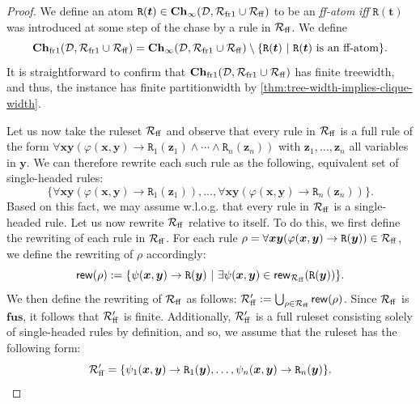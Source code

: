 \documentclass[10pt,a4paper]{amsart}
\theoremstyle{definition}
\numberwithin{equation}{section}
\theoremstyle{plain}
\theoremstyle{definition}
\theoremstyle{myexample}
\theoremstyle{plain}
\theoremstyle{definition}
\renewcommand{\vec}[1]{\boldsymbol{#1}}
\newcommand{\database}{\mathcal{D}}
\newcommand{\db}{\database}
\newcommand{\hypercliquewidth}{\partitionwidth}
\newcommand{\partitionwidth}{par\-ti\-tion\-width}
\newcommand{\fcn}[1]{\mathsf{#1}}
\newcommand{\ruleset}{\calr}
\newcommand{\fus}{\mathbf{fus}}
\newcommand{\chase}{\mathbf{Ch}}
\newcommand{\calr}{\mathcal{R}}
\newcommand{\pred}[1]{\mathtt{#1}}
\newcommand{\rpred}{\pred{R}}
\newcommand{\iffi}{\textit{iff} } %
\renewcommand{\phi}{\varphi}
\begin{document}
\begin{proof} We define an atom $\rpred(\vec{t}) \in \chase_{\infty}(\db,\ruleset_{\smash{\mathrm{fr1}}} \cup \ruleset_{\smash{\mathrm{ff}}})$ to be an \emph{ff-atom} \iffi $\rpred(\vec{t})$ was introduced at some step of the chase by a rule in $\ruleset_{\smash{\mathrm{ff}}}$. We define 
$$
\chase_{\smash{\mathrm{fr1}}}(\db,\ruleset_{\smash{\mathrm{fr1}}} \cup \ruleset_{\smash{\mathrm{ff}}}) = \chase_{\infty}(\db,\ruleset_{\smash{\mathrm{fr1}}} \cup \ruleset_{\smash{\mathrm{ff}}}) \setminus \{\rpred(\vec{t}) \ | \ \rpred(\vec{t}) \text{ is an ff-atom} \}.
$$%
 It is straightforward to confirm that $\chase_{\smash{\mathrm{fr1}}}(\db,\ruleset_{\smash{\mathrm{fr1}}} \cup \ruleset_{\smash{\mathrm{ff}}})$ has finite treewidth, and thus, the instance has finite \hypercliquewidth{} by \cref{thm:tree-width-implies-clique-width}. 
 
 Let us now take the ruleset $\ruleset_{\smash{\mathrm{ff}}}$ and observe that every rule in $\ruleset_{\smash{\mathrm{ff}}}$ is a full rule of the form $\forall \vec{x} \vec{y}(\phi(\vec{x},\vec{y}) \rightarrow \rpred_{1}(\vec{z}_{1}) \land \cdots \land \rpred_{n}(\vec{z}_{n}))$ with $\vec{z}_{1}, \ldots, \vec{z}_{n}$ all variables in $\vec{y}$. We can therefore rewrite each such rule as the following, equivalent set of single-headed rules:
$$
\{\forall \vec{x} \vec{y}(\phi(\vec{x},\vec{y}) \rightarrow \rpred_{1}(\vec{z}_{1})), \ldots, \forall \vec{x} \vec{y}(\phi(\vec{x},\vec{y}) \rightarrow \rpred_{n}(\vec{z}_{n}))\}.
$$%
Based on this fact, we may assume w.l.o.g. that every rule in $\ruleset_{\smash{\mathrm{ff}}}$ is a single-headed rule.
%
 Let us now rewrite $\ruleset_{\smash{\mathrm{ff}}}$ relative to itself. To do this, we first define the rewriting of each rule in $\ruleset_{\smash{\mathrm{ff}}}$. For each rule $\rho = \forall \vec{x} \vec{y}(\phi(\vec{x},\vec{y}) \rightarrow \rpred(\vec{y})) \in \ruleset_{\smash{\mathrm{ff}}}$, we define the rewriting of $\rho$ accordingly:
$$
\fcn{rew}(\rho) := \{\psi(\vec{x}, \vec{y}) \rightarrow \rpred(\vec{y}) \ | \ \exists \psi(\vec{x},\vec{y}) \in \fcn{rew}_{\ruleset_{\smash{\mathrm{ff}}}}(\rpred(\vec{y})) \}.
$$%
We then define the rewriting of $\ruleset_{\smash{\mathrm{ff}}}$ as follows: $\ruleset_{\smash{\mathrm{ff}}}' := \bigcup_{\rho \in \ruleset_{\smash{\mathrm{ff}}}} \fcn{rew}(\rho)$. Since $\ruleset_{\smash{\mathrm{ff}}}$ is $\fus$, it follows that $\ruleset_{\smash{\mathrm{ff}}}'$ is finite. Additionally, $\ruleset_{\smash{\mathrm{ff}}}'$ is a full ruleset consisting solely of single-headed rules by definition, and so, we assume that the ruleset has the following form:
$$
\ruleset_{\smash{\mathrm{ff}}}' = \{\psi_{1}(\vec{x}, \vec{y}) \rightarrow \rpred_{1}(\vec{y}), \ldots, \psi_{n}(\vec{x}, \vec{y}) \rightarrow \rpred_{n}(\vec{y})\}.
$$


\end{proof}
\end{document}
